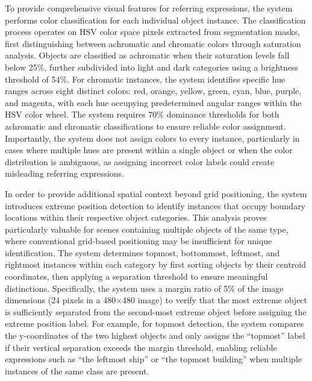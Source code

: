 To provide comprehensive visual features for referring expressions, the system performs color classification for each individual object instance. The classification process operates on HSV color space pixels extracted from segmentation masks, first distinguishing between achromatic and chromatic colors through saturation analysis. Objects are classified as achromatic when their saturation levels fall below 25\%, further subdivided into light and dark categories using a brightness threshold of 54\%. For chromatic instances, the system identifies specific hue ranges across eight distinct colors: red, orange, yellow, green, cyan, blue, purple, and magenta, with each hue occupying predetermined angular ranges within the HSV color wheel. The system requires 70\% dominance thresholds for both achromatic and chromatic classifications to ensure reliable color assignment. Importantly, the system does not assign colors to every instance, particularly in cases where multiple hues are present within a single object or when the color distribution is ambiguous, as assigning incorrect color labels could create misleading referring expressions.

In order to provide additional spatial context beyond grid positioning, the system introduces extreme position detection to identify instances that occupy boundary locations within their respective object categories. This analysis proves particularly valuable for scenes containing multiple objects of the same type, where conventional grid-based positioning may be insufficient for unique identification. The system determines topmost, bottommost, leftmost, and rightmost instances within each category by first sorting objects by their centroid coordinates, then applying a separation threshold to ensure meaningful distinctions. Specifically, the system uses a margin ratio of 5\% of the image dimensions (24 pixels in a 480$\times$480 image) to verify that the most extreme object is sufficiently separated from the second-most extreme object before assigning the extreme position label. For example, for topmost detection, the system compares the y-coordinates of the two highest objects and only assigns the ``topmost'' label if their vertical separation exceeds the margin threshold, enabling reliable expressions such as ``the leftmost ship'' or ``the topmost building'' when multiple instances of the same class are present.

